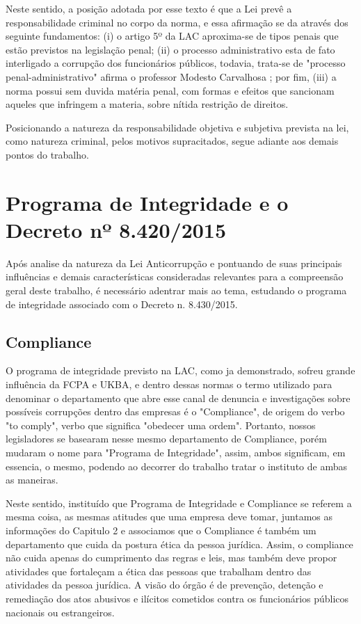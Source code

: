 Neste sentido, a posição adotada por esse texto é que a Lei prevê a responsabilidade criminal no corpo da norma, e essa afirmação se da através dos seguinte fundamentos: (i) o artigo 5º da LAC aproxima-se de tipos penais que estão previstos na legislação penal; (ii) o processo administrativo esta de fato interligado a corrupção dos funcionários públicos, todavia, trata-se de "processo penal-administrativo" afirma o professor Modesto Carvalhosa \cite{modestocarvalhosa}; por fim, (iii) a norma possui sem duvida matéria penal, com formas e efeitos que sancionam aqueles que infringem a materia, sobre nítida restrição de direitos. 

Posicionando a natureza da responsabilidade objetiva e subjetiva prevista na lei, como natureza criminal, pelos motivos supracitados, segue adiante aos demais pontos do trabalho. 

\chapter{Programa de Integridade e o Decreto nº 8.420/2015}

Após analise da natureza da Lei Anticorrupção e pontuando de suas principais influências e demais características consideradas relevantes para a compreensão geral deste trabalho, é necessário adentrar mais ao tema, estudando o programa de integridade associado com o Decreto n. 8.430/2015. 

\section{Compliance}

O programa de integridade previsto na LAC, como ja demonstrado, sofreu grande influência da FCPA e UKBA, e dentro dessas normas o termo utilizado para denominar o departamento que abre esse canal de denuncia e investigações sobre possíveis corrupções  dentro das empresas é o "Compliance", de origem do verbo "to comply", verbo que significa "obedecer uma ordem". Portanto, nossos legisladores se basearam nesse mesmo departamento de Compliance, porém mudaram o nome para "Programa de Integridade", assim, ambos significam, em essencia, o mesmo, podendo ao decorrer do trabalho tratar o instituto de ambas as maneiras. 

Neste sentido, instituído que Programa de Integridade e Compliance se referem a mesma coisa, as mesmas atitudes que uma empresa deve tomar, juntamos as informações do Capitulo 2 e associamos que o Compliance é também um departamento que cuida da postura ética da pessoa jurídica. Assim, o compliance não cuida apenas do cumprimento das regras e leis, mas também deve propor atividades que fortaleçam a ética das pessoas que trabalham dentro das atividades da pessoa jurídica. A visão do órgão é de prevenção, detenção e remediação dos atos abusivos e ilícitos cometidos contra os funcionários públicos nacionais ou estrangeiros. 

